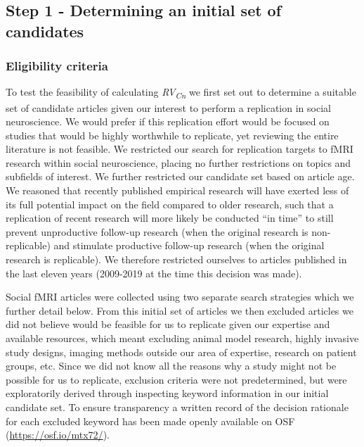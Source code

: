 \documentclass[
  english,
  man,floatsintext]{apa6}
\begin{document}
\hypertarget{step-1---determining-an-initial-set-of-candidates}{%
\subsection{Step 1 - Determining an initial set of candidates}\label{step-1---determining-an-initial-set-of-candidates}}

\hypertarget{eligibility-criteria}{%
\subsubsection{Eligibility criteria}\label{eligibility-criteria}}

To test the feasibility of calculating \emph{RV\textsubscript{Cn}} we first set out to determine a suitable set of candidate articles given our interest to perform a replication in social neuroscience. We would prefer if this replication effort would be focused on studies that would be highly worthwhile to replicate, yet reviewing the entire literature is not feasible. We restricted our search for replication targets to fMRI research within social neuroscience, placing no further restrictions on topics and subfields of interest. We further restricted our candidate set based on article age. We reasoned that recently published empirical research will have exerted less of its full potential impact on the field compared to older research, such that a replication of recent research will more likely be conducted ``in time'' to still prevent unproductive follow-up research (when the original research is non-replicable) and stimulate productive follow-up research (when the original research is replicable). We therefore restricted ourselves to articles published in the last eleven years (2009-2019 at the time this decision was made).

Social fMRI articles were collected using two separate search strategies which we further detail below. From this initial set of articles we then excluded articles we did not believe would be feasible for us to replicate given our expertise and available resources, which meant excluding animal model research, highly invasive study designs, imaging methods outside our area of expertise, research on patient groups, etc. Since we did not know all the reasons why a study might not be possible for us to replicate, exclusion criteria were not predetermined, but were exploratorily derived through inspecting keyword information in our initial candidate set. To ensure transparency a written record of the decision rationale for each excluded keyword has been made openly available on OSF (\url{https://osf.io/mtx72/}).\\
\end{document}
